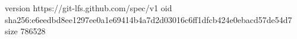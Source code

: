 version https://git-lfs.github.com/spec/v1
oid sha256:e6eedbd8ee1297ee0a1e69414b4a7d2d03016c6ff1dfcb424e0ebacd57de54d7
size 786528
